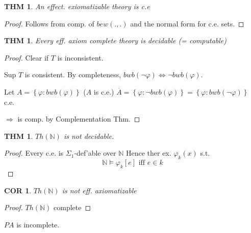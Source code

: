 \documentclass[12pt]{article}
\newcommand{\Nat}{\ensuremath{\mathbb{N}}}
\newcommand{\Conj}[1]{\ensuremath{\overline{#1}}}
\begin{document}
\newtheorem*{cethm}{THM}
\begin{cethm}
  An effect. exiomatizable theory is c.e
\end{cethm}
\begin{proof}
  Follows from comp. of $bew(.,.)$
  and the normal form for c.e. sets.
\end{proof}
\newtheorem*{decthm}{THM}
\begin{decthm}
Every eff. axiom complete theory is decidable (= computable)
\end{decthm}
\begin{proof}
  Clear if $T$ is inconsistent.

  Sup $T$ is consistent.
  By completeness, $bwb(\neg \varphi) \Leftrightarrow \neg bwb(\varphi)$.

  Let $A = \left\{\varphi : bwb(\varphi)\right\}$ ($A$ is c.e.)
  $\Conj{A} = \left\{\varphi : \neg bwb(\varphi)\right\} = \left\{\varphi : bwb(\neg \varphi) \right\}
  $ c.e.

  $\Rightarrow $ is comp. by Complementation Thm.
\end{proof}

\newtheorem*{notdecthm}{THM}
\begin{notdecthm}
  $Th(\Nat)$ is not decidable.
\end{notdecthm}
\begin{proof}
  Every c.e. is $\Sigma_1$-def'able over $\Nat$
  Hence ther ex. $\varphi_k(x)$ s.t.
  \[
  \Nat \models \varphi_k[e] \text{ iff } e \in k
  \]
\end{proof}

\newtheorem*{cor}{COR}
\begin{cor}
  $Th(\Nat)$ is not eff. axiomatizable
\end{cor}
\begin{proof}
  $Th(\Nat)$ complete
\end{proof}

$PA$ is incomplete.
\end{document}
